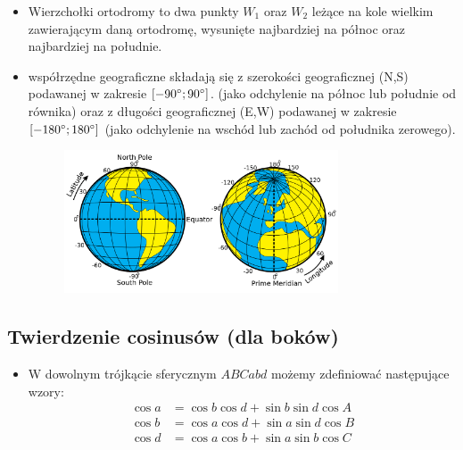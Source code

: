 \documentclass[10pt, twoside, fleqn]{article}
\begin{document}
\begin{itemize}
				\vspace{-2pt}		
				\item	Wierzchołki ortodromy to dwa punkty $W_1$ oraz $W_2$
						leżące na kole wielkim zawierającym daną ortodromę, 
						wysunięte najbardziej na północ oraz 
						najbardziej na południe.
				
				\vspace{-2pt}		
				\item	współrzędne geograficzne składają się z szerokości
						geograficznej (N,S) podawanej w zakresie 
						$[-90\degree;90\degree]$.
						(jako odchylenie na północ lub południe od równika) oraz
						z długości geograficznej (E,W) podawanej w zakresie 
						$[-180\degree;180\degree]$ (jako odchylenie na wschód 
						lub zachód od południka zerowego).
					
						\begin{figure}[h!]
							\centering
							\includegraphics[height=120pt]
											{wspolrzedne.png}
						\end{figure}					
						
			\end{itemize}
				
				
\subsection{Twierdzenie cosinusów (dla boków)}	\label{tw_cos}

			\begin{itemize}
				\item	W dowolnym trójkącie sferycznym $ABCabd$ możemy
						zdefiniować następujące wzory:
					\begin{align*}
						\cos{a} & = \cos{b} \cos{d} +	\sin{b} \sin{d} \cos{A}	\\
						\cos{b} & = \cos{a} \cos{d} +	\sin{a} \sin{d} \cos{B}	\\
						\cos{d} & = \cos{a} \cos{b} +	\sin{a} \sin{b} \cos{C}  
				\end{align*}							
			\end{itemize}						
\end{document}
